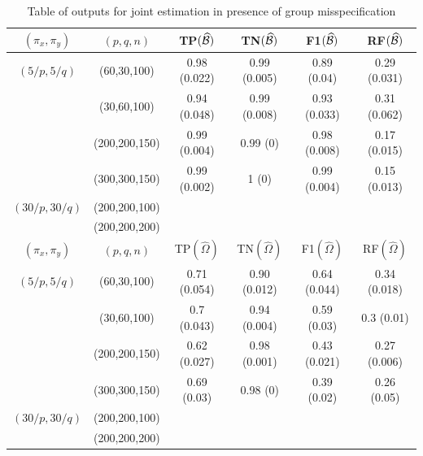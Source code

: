 \begin{scriptsize}
\begin{table}
\centering
    \begin{tabular}{cccccc}
    \hline
    $(\pi_x, \pi_y)$ & $(p,q,n)$   & TP$(\widehat {{\cal{B}}})$            & TN$(\widehat {{\cal{B}}})$             & F1$(\widehat {{\cal{B}}})$ & RF$(\widehat {{\cal{B}}})$    \\ \hline
    $(5/p, 5/q)$   & (60,30,100)   & 0.98 (0.022)  & 0.99 (0.005)   & 0.89 (0.04)   & 0.29 (0.031) \\
    ~              & (30,60,100)   & 0.94 (0.048)  & 0.99 (0.008)   & 0.93 (0.033)  & 0.31 (0.062) \\
    ~              & (200,200,150) & 0.99 (0.004)  & 0.99 (0)       & 0.98 (0.008)  & 0.17 (0.015) \\
    ~              & (300,300,150) & 0.99 (0.002)  & 1 (0)          & 0.99 (0.004)  & 0.15 (0.013) \\
    $(30/p, 30/q)$ & (200,200,100) & ~             & ~              & ~   & ~             \\
    ~              & (200,200,200) & ~             & ~              & ~   & ~             \\ \hline
    \hline
    $(\pi_x, \pi_y)$ & $(p,q,n)$   & TP$(\widehat \Omega)$            & TN$(\widehat \Omega)$             & F1$(\widehat \Omega)$ & RF$(\widehat \Omega)$            \\ \hline
    $(5/p, 5/q)$   & (60,30,100)   & 0.71 (0.054)  & 0.90 (0.012)   & 0.64 (0.044)  & 0.34 (0.018) \\
    ~              & (30,60,100)   & 0.7 (0.043)   & 0.94 (0.004)   & 0.59 (0.03)   & 0.3 (0.01)   \\
    ~              & (200,200,150) & 0.62 (0.027)  & 0.98 (0.001)   & 0.43 (0.021)  & 0.27 (0.006) \\
    ~              & (300,300,150) & 0.69 (0.03)   & 0.98 (0)       & 0.39 (0.02)   & 0.26 (0.05) \\
    $(30/p, 30/q)$ & (200,200,100) & ~             & ~              & ~   & ~             \\
    ~              & (200,200,200) & ~             & ~              & ~   & ~             \\ \hline
    \end{tabular}
    \caption{Table of outputs for joint estimation in presence of group misspecification}
    \label{table:simtable2}
\end{table}
\end{scriptsize}

